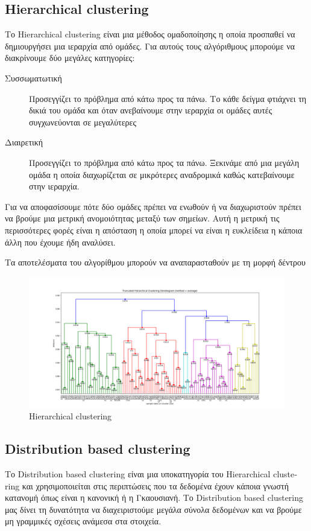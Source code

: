 \subsection{\textlatin{Hierarchical clustering}}
Το \textlatin{Hierarchical clustering} είναι μια μέθοδος ομαδοποίησης η οποία προσπαθεί να δημιουργήσει μια ιεραρχία από ομάδες. Για αυτούς τους αλγόριθμους μπορούμε να διακρίνουμε δύο μεγάλες
κατηγορίες\cite{wkhc}:
\begin{description}
    \item[Συσσωματωτική] Προσεγγίζει το πρόβλημα από κάτω προς τα πάνω. Το κάθε δείγμα φτιάχνει τη δικιά του ομάδα και όταν ανεβαίνουμε στην ιεραρχία οι ομάδες αυτές συγχωνεύονται σε μεγαλύτερες
    \item[Διαιρετική] Προσεγγίζει το πρόβλημα από κάτω προς τα πάνω. Ξεκινάμε από μια μεγάλη ομάδα η οποία διαχωρίζεται σε μικρότερες αναδρομικά καθώς κατεβαίνουμε στην ιεραρχία.
\end{description}
Για να αποφασίσουμε πότε δύο ομάδες πρέπει να ενωθούν ή να διαχωριστούν πρέπει να βρούμε μια μετρική ανομοιότητας μεταξύ των σημείων. Αυτή η μετρική τις περισσότερες φορές είναι η απόσταση η οποία μπορεί να είναι η ευκλείδεια η κάποια άλλη που έχουμε ήδη αναλύσει.\par
Τα αποτελέσματα του αλγορίθμου μπορούν να αναπαρασταθούν με τη μορφή δέντρου
\begin{figure}[H]
    \centering
    \includegraphics[width=1\textwidth]{images/hierarchical_clustering.png}
    \caption{\textlatin{Hierarchical clustering}}
\end{figure}
\subsection{\textlatin{Distribution based clustering}}
Το \textlatin{Distribution based clustering} είναι μια υποκατηγορία του \textlatin{Hierarchical clustering} και χρησιμοποιείται στις περιπτώσεις που τα δεδομένα έχουν κάποια γνωστή κατανομή όπως
είναι η κανονική ή η Γκαουσιανή. Το \textlatin{Distribution based clustering} μας δίνει τη δυνατότητα να διαχειριστούμε μεγάλα σύνολα δεδομένων και να βρούμε μη γραμμικές σχέσεις ανάμεσα στα
στοιχεία\cite{hcdf}.
